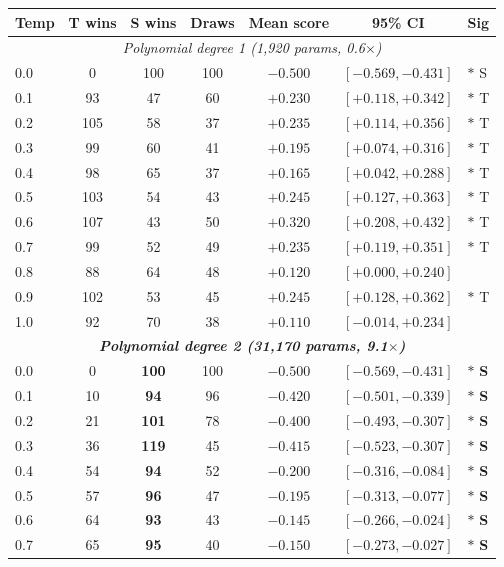 \documentclass[11pt]{article}
\theoremstyle{definition}
\begin{document}
\begin{table}[H]
\centering\small
\begin{tabular}{lcccccl}
\toprule
Temp & T wins & S wins & Draws & Mean score & 95\% CI & Sig \\
\midrule
\multicolumn{7}{c}{\textit{Polynomial degree 1 (1,920 params, 0.6$\times$)}} \\
\midrule
0.0 & 0 & 100 & 100 & $-0.500$ & $[-0.569, -0.431]$ & $*$ S \\
0.1 & 93 & 47 & 60 & $+0.230$ & $[+0.118, +0.342]$ & $*$ T \\
0.2 & 105 & 58 & 37 & $+0.235$ & $[+0.114, +0.356]$ & $*$ T \\
0.3 & 99 & 60 & 41 & $+0.195$ & $[+0.074, +0.316]$ & $*$ T \\
0.4 & 98 & 65 & 37 & $+0.165$ & $[+0.042, +0.288]$ & $*$ T \\
0.5 & 103 & 54 & 43 & $+0.245$ & $[+0.127, +0.363]$ & $*$ T \\
0.6 & 107 & 43 & 50 & $+0.320$ & $[+0.208, +0.432]$ & $*$ T \\
0.7 & 99 & 52 & 49 & $+0.235$ & $[+0.119, +0.351]$ & $*$ T \\
0.8 & 88 & 64 & 48 & $+0.120$ & $[+0.000, +0.240]$ & \\
0.9 & 102 & 53 & 45 & $+0.245$ & $[+0.128, +0.362]$ & $*$ T \\
1.0 & 92 & 70 & 38 & $+0.110$ & $[-0.014, +0.234]$ & \\
\midrule
\multicolumn{7}{c}{\textit{\textbf{Polynomial degree 2 (31,170 params, 9.1$\times$)}}} \\
\midrule
0.0 & 0 & \textbf{100} & 100 & $-0.500$ & $[-0.569, -0.431]$ & $*$ \textbf{S} \\
0.1 & 10 & \textbf{94} & 96 & $-0.420$ & $[-0.501, -0.339]$ & $*$ \textbf{S} \\
0.2 & 21 & \textbf{101} & 78 & $-0.400$ & $[-0.493, -0.307]$ & $*$ \textbf{S} \\
0.3 & 36 & \textbf{119} & 45 & $-0.415$ & $[-0.523, -0.307]$ & $*$ \textbf{S} \\
0.4 & 54 & \textbf{94} & 52 & $-0.200$ & $[-0.316, -0.084]$ & $*$ \textbf{S} \\
0.5 & 57 & \textbf{96} & 47 & $-0.195$ & $[-0.313, -0.077]$ & $*$ \textbf{S} \\
0.6 & 64 & \textbf{93} & 43 & $-0.145$ & $[-0.266, -0.024]$ & $*$ \textbf{S} \\
0.7 & 65 & \textbf{95} & 40 & $-0.150$ & $[-0.273, -0.027]$ & $*$ \textbf{S} \\

\end{tabular}
\end{table}
\end{document}
